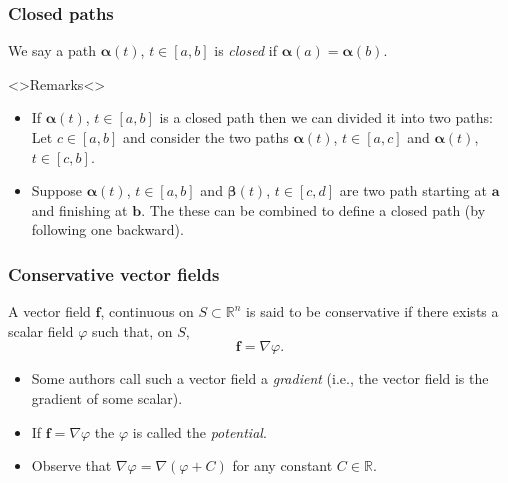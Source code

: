 \documentclass[aspectratio=169,handout]{beamer}
\newcommand{\bR}{\mathbb{R}} %
\renewcommand{\aa}{\mathbf{a}}
\newcommand{\bb}{\mathbf{b}}
\newcommand{\ff}{\mathbf{f}}
\newcommand{\aalpha}{\boldsymbol{\alpha}}
\newcommand{\bbeta}{\boldsymbol{\beta}}
\begin{document}
\begin{frame}
    \frametitle{Closed paths}

    \begin{definition}
        We say a path \(\aalpha(t)\), \(t\in [a,b]\) is \emph{closed} if \(\aalpha(a) = \aalpha(b)\).
    \end{definition}


    \begin{block}<>{Remarks}<>
        \begin{itemize}
            \item If \(\aalpha(t)\), \(t\in[a,b]\) is a closed path then we can divided it into two paths: Let \(c\in[a,b]\) and consider the two paths \(\aalpha(t)\), \(t\in[a,c]\) and  \(\aalpha(t)\), \(t\in[c,b]\).
            \item Suppose \(\aalpha(t)\), \(t\in [a,b]\) and  \(\bbeta(t)\), \(t\in [c,d]\) are two path starting at \(\aa\) and finishing at \(\bb\). The these can be combined to define a closed path (by following one backward).
        \end{itemize}
    \end{block}
\end{frame}


\begin{frame}
    \frametitle{Conservative vector fields}

    \begin{definition}
        A vector field \(\ff\), continuous on \(S \subset \bR^n\) is said to be conservative if there exists a scalar field \(\varphi\) such that, on \(S\), \[\ff = \nabla \varphi.\]
    \end{definition}


    \begin{itemize}
        \item     Some authors call such a vector field a \emph{gradient} (i.e., the vector field is the gradient of some scalar).
        \item If \(\ff = \nabla \varphi\) the \(\varphi\) is called the \emph{potential}.
    \end{itemize}

    \begin{itemize}
        \item     Observe that \(\nabla \varphi = \nabla(\varphi + C)\) for any constant \(C \in \bR\).
    \end{itemize}

\end{frame}
\end{document}
